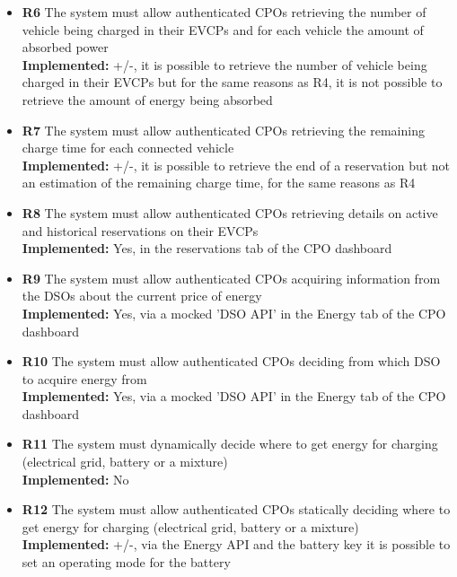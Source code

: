 \begin{itemize}
      \item        \textbf{R6}  The system must allow authenticated CPOs retrieving the number of vehicle being charged in their EVCPs and for each vehicle the amount of absorbed power \\
            \textbf{Implemented:} +/-, it is possible to retrieve the number of vehicle being charged in their EVCPs but for the same reasons as R4, it is not possible to retrieve the amount of energy being absorbed
      \item        \textbf{R7}  The system must allow authenticated CPOs retrieving the remaining charge time for each connected vehicle                                                 \\
            \textbf{Implemented:} +/-, it is possible to retrieve the end of a reservation but not an estimation of the remaining charge time, for the same reasons as R4
      \item        \textbf{R8}  The system must allow authenticated CPOs retrieving details on active and historical reservations on their EVCPs                                         \\
            \textbf{Implemented:} Yes, in the reservations tab of the CPO dashboard
      \item        \textbf{R9}  The system must allow authenticated CPOs acquiring information from the DSOs about the current price of energy                                           \\
            \textbf{Implemented:} Yes, via a mocked 'DSO API' in the Energy tab of the CPO dashboard
      \item        \textbf{R10} The system must allow authenticated CPOs deciding from which DSO to acquire energy from                                                                  \\
            \textbf{Implemented:} Yes, via a mocked 'DSO API' in the Energy tab of the CPO dashboard
      \item        \textbf{R11} The system must dynamically decide where to get energy for charging (electrical grid, battery or a mixture)                                              \\
            \textbf{Implemented:} No
      \item        \textbf{R12} The system must allow authenticated CPOs statically deciding where to get energy for charging (electrical grid, battery or a mixture)                    \\
            \textbf{Implemented:} +/-, via the Energy API and the battery key it is possible to set an operating mode for the battery

\end{itemize}

